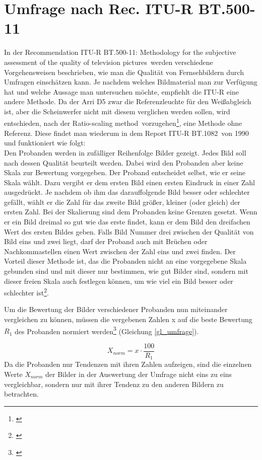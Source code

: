 \section{Umfrage nach Rec. ITU-R  BT.500-11}
\label{sec_umfrageitu}
In der \glqq Recommendation ITU-R BT.500-11: Methodology for the subjective assessment of the 
quality of television pictures\grqq\ werden verschiedene Vorgehensweisen beschrieben, wie man die Qualität von Fernsehbildern durch Umfragen einschätzen kann. Je nachdem welches Bildmaterial man zur Verfügung hat und welche Aussage man untersuchen möchte, empfiehlt die ITU-R eine andere Methode. Da der Arri D5 zwar die Referenzleuchte für den Weißabgleich ist, aber die Scheinwerfer nicht mit diesem verglichen werden sollen, wird entschieden, nach der \glqq Ratio-scaling method\grqq\ vorzugehen\footnote{\cite[10]{itu}}, eine Methode ohne Referenz. Diese findet man wiederum in dem \glqq Report ITU-R BT.1082\grqq\ von 1990 und funktioniert wie folgt:\\
Den Probanden werden in zufälliger Reihenfolge Bilder gezeigt. Jedes  Bild soll nach dessen Qualität beurteilt werden. Dabei wird den Probanden aber keine Skala zur Bewertung vorgegeben. Der Proband entscheidet selbst, wie er seine Skala wählt. Dazu vergibt er dem ersten Bild einen ersten Eindruck in einer Zahl ausgedrückt. Je nachdem ob ihm das darauffolgende Bild besser oder schlechter gefällt, wählt er die Zahl für das zweite Bild größer, kleiner (oder gleich) der ersten Zahl. Bei der Skalierung sind dem Probanden keine Grenzen gesetzt. Wenn er ein Bild dreimal so gut wie das erste findet, kann er dem Bild den dreifachen Wert des ersten Bildes geben. Falls Bild Nummer drei zwischen der Qualität von Bild eins und zwei liegt, darf der Proband auch mit Brüchen oder Nachkommastellen einen Wert zwischen der Zahl eins und zwei finden. Der Vorteil dieser Methode ist, das die Probanden nicht an eine vorgegebene Skala gebunden sind und mit dieser nur bestimmen, wie gut Bilder sind, sondern mit dieser freien Skala auch festlegen können, um wie viel ein Bild besser oder schlechter ist\footnote{\cite[385]{itu90}}. 

\newpage \noindent Um die Bewertung der Bilder verschiedener Probanden nun miteinander vergleichen zu können, müssen die vergebenen Zahlen x auf die beste Bewertung $R_{1}$ des Probanden normiert werden\footnote{\cite[387]{itu90}} (Gleichung \ref{gl_umfrage}).

\begin{equation}\label{gl_umfrage}
		X_{norm} = x \cdot \frac{100}{R_{1}}
\end{equation}
Da die Probanden nur Tendenzen mit ihren Zahlen aufzeigen, sind die einzelnen Werte $X_{norm}$ der Bilder in der Auswertung der Umfrage nicht eins zu eins vergleichbar, sondern nur mit ihrer Tendenz zu den anderen Bildern zu betrachten.

